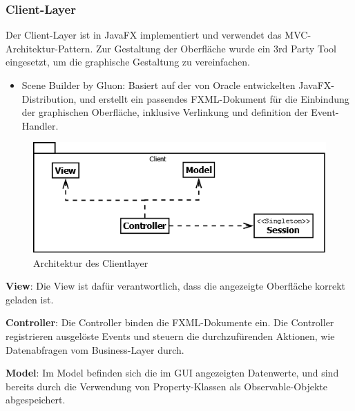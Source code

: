 \subsubsection{Client-Layer}
Der Client-Layer ist in JavaFX implementiert und verwendet das MVC-Architektur-Pattern. Zur Gestaltung der Oberfläche wurde ein 3rd Party Tool eingesetzt, um die graphische Gestaltung zu vereinfachen.
\begin{itemize}
\item Scene Builder by Gluon: Basiert auf der von Oracle entwickelten JavaFX-Distribution, und erstellt ein passendes FXML-Dokument für die Einbindung der graphischen Oberfläche, inklusive Verlinkung und definition der Event-Handler. 
\end{itemize}
\begin{figure}[H]
	\includegraphics[width=1.0\linewidth]{Images/ClientLayer-Architektur}
	\caption{Architektur des Clientlayer}
	\label{fig:clientlayer-architektur}
\end{figure}

\textbf{View}: Die View ist dafür verantwortlich, dass die angezeigte Oberfläche korrekt geladen ist.

\textbf{Controller}: Die Controller binden die FXML-Dokumente ein. Die Controller registrieren ausgelöste Events und steuern die durchzufürenden Aktionen, wie Datenabfragen vom Business-Layer durch.

\textbf{Model}: Im Model befinden sich die im GUI angezeigten Datenwerte, und sind bereits durch die Verwendung von Property-Klassen als Observable-Objekte abgespeichert.

